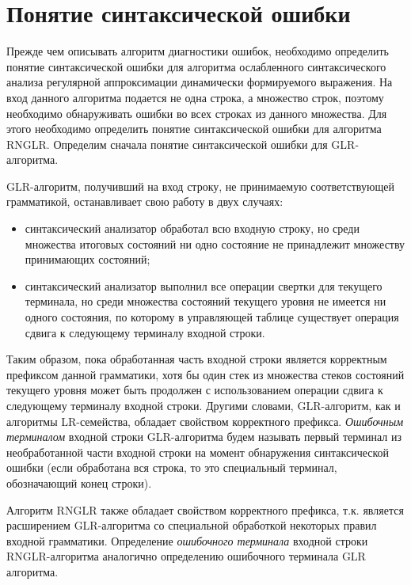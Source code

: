 
\section{Понятие синтаксической ошибки}
Прежде чем описывать алгоритм диагностики ошибок, необходимо определить понятие синтаксической ошибки для алгоритма ослабленного синтаксического анализа регулярной аппроксимации динамически формируемого выражения. На вход данного алгоритма подается не одна строка, а множество строк, поэтому необходимо обнаруживать ошибки во всех строках из данного множества. Для этого необходимо определить понятие синтаксической ошибки для алгоритма RNGLR. Определим сначала понятие синтаксической ошибки для GLR-алгоритма.

GLR-алгоритм, получивший на вход строку, не принимаемую соответствующей грамматикой, останавливает свою работу в двух случаях:
\begin{itemize}
    \item синтаксический анализатор обработал всю входную строку, но среди множества итоговых состояний ни одно состояние не принадлежит множеству принимающих состояний;
    \item синтаксический анализатор выполнил все операции свертки для текущего терминала, но среди множества состояний текущего уровня не имеется ни одного состояния, по которому в управляющей таблице существует операция сдвига к следующему терминалу входной строки.
\end{itemize}

Таким образом, пока обработанная часть входной строки является корректным префиксом данной грамматики, хотя бы один стек из множества стеков состояний текущего уровня может быть продолжен с использованием операции сдвига к следующему терминалу входной строки. Другими словами, GLR-алгоритм, как и алгоритмы LR-семейства, обладает свойством корректного префикса. \emph{Ошибочным терминалом} входной строки GLR-алгоритма будем называть первый терминал из необработанной части входной строки на момент обнаружения синтаксической ошибки (если обработана вся строка, то это специальный терминал, обозначающий конец строки).

Алгоритм RNGLR также обладает свойством корректного префикса, т.к. является расширением GLR-алгоритма со специальной обработкой некоторых правил входной грамматики. Определение \emph{ошибочного терминала} входной строки RNGLR-алгоритма аналогично определению ошибочного терминала GLR алгоритма.


